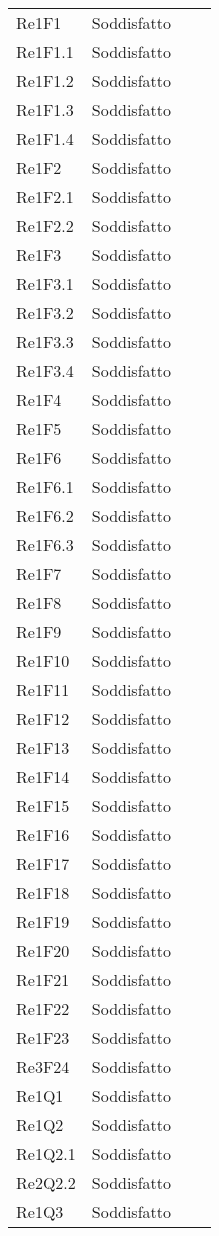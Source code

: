 \begin{longtable}{C{3cm} C{3cm} L{5.5cm} C{3cm}}
Re1F1 & Soddisfatto\\
Re1F1.1 & Soddisfatto\\
Re1F1.2 & Soddisfatto\\
Re1F1.3 & Soddisfatto\\
Re1F1.4 & Soddisfatto\\
Re1F2 & Soddisfatto\\
Re1F2.1 & Soddisfatto\\
Re1F2.2 & Soddisfatto\\
Re1F3 & Soddisfatto\\
Re1F3.1 & Soddisfatto\\
Re1F3.2 & Soddisfatto\\
Re1F3.3 & Soddisfatto\\
Re1F3.4 & Soddisfatto\\
Re1F4 & Soddisfatto\\
Re1F5 & Soddisfatto\\
Re1F6 & Soddisfatto\\
Re1F6.1 & Soddisfatto\\
Re1F6.2 & Soddisfatto\\
Re1F6.3 & Soddisfatto\\
Re1F7 & Soddisfatto\\
Re1F8 & Soddisfatto\\
Re1F9 & Soddisfatto\\
Re1F10 & Soddisfatto\\
Re1F11 & Soddisfatto\\
Re1F12 & Soddisfatto\\
Re1F13 & Soddisfatto\\
Re1F14 & Soddisfatto\\
Re1F15 & Soddisfatto\\
Re1F16 & Soddisfatto\\
Re1F17 & Soddisfatto\\
Re1F18 & Soddisfatto\\
Re1F19 & Soddisfatto\\
Re1F20 & Soddisfatto\\
Re1F21 & Soddisfatto\\
Re1F22 & Soddisfatto\\
Re1F23 & Soddisfatto\\
Re3F24 & Soddisfatto\\
Re1Q1 & Soddisfatto\\
Re1Q2 & Soddisfatto\\
Re1Q2.1 & Soddisfatto\\
Re2Q2.2 & Soddisfatto\\
Re1Q3 & Soddisfatto\\

\end{longtable}
